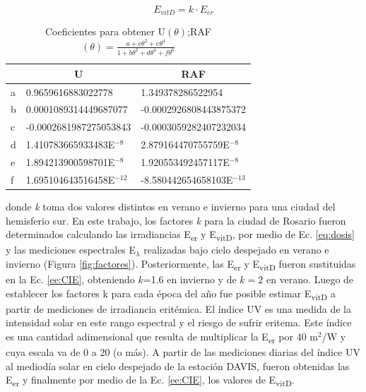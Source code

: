 \documentclass[10pt,twocolumn]{article}
\begin{document}
\begin{equation}
  E_{vitD} = k \cdot E_{er}
  \label{ee:CIE}
\end{equation}
\begin{table}[ht]
  \centering
  \caption{Coeficientes\cite{Herman2010} para obtener U$(\theta)$;RAF $(\theta)= \frac{a+c\theta^2+e\theta^4}{1+b\theta^2+d\theta^4+f\theta^6}$}
  \label{table::parametros}
  \begin{tabular}{lll}
    \hline
      & \multicolumn{1}{c}{U}      & \multicolumn{1}{c}{RAF}     \\ \hline
    a & 0.9659616883022778         & 1.349378286522954           \\
    b & 0.0001089314449687077      & -0.0002926808443875372      \\
    c & -0.0002681987275053843     & -0.0003059282407232034      \\
    d & 1.410783665933483E$^{-8 }$ & 2.879164470755759E$^{-8}$   \\
    e & 1.894213900598701E$^{-8 }$ & 1.920553492457117E$^{-8}$   \\
    f & 1.695104643516458E$^{-12}$ & -8.580442654658103E$^{-13}$ \\ \hline
  \end{tabular}
\end{table}

donde \emph{k} toma dos valores distintos en verano e invierno para una ciudad del hemisferio sur. En este trabajo, los factores \emph{k} para la ciudad de Rosario fueron determinados calculando las irradiancias E\textsubscript{er} y E\textsubscript{vitD}, por medio de Ec. \ref{eq:dosis} y las mediciones espectrales E$_\lambda$ realizadas bajo cielo despejado en verano e invierno (Figura \ref{fig:factores}). Posteriormente, las E\textsubscript{er} y E\textsubscript{vitD} fueron sustituidas en la Ec. \ref{ee:CIE}, obteniendo $k$=1.6 en invierno y de $k=2$ en verano. Luego de establecer los factores k para cada época del año fue posible estimar E\textsubscript{vitD} a partir de mediciones de irradiancia eritémica. El índice UV es una medida de la intensidad solar en este rango espectral y el riesgo de sufrir eritema. Este índice es una cantidad adimensional que resulta de multiplicar la E\textsubscript{er} por 40 m$^2$/W y cuya escala va de 0 a 20 (o más). A partir de las mediciones diarias del índice UV al mediodía solar en cielo despejado de la estación DAVIS, fueron obtenidas las E\textsubscript{er} y finalmente por medio de la Ec. \ref{ee:CIE}, los valores de E\textsubscript{vitD}.
\end{document}
